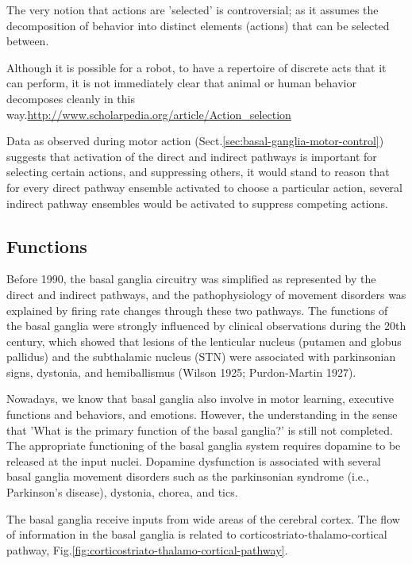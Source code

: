 \begin{mdframed}
The very notion that actions are 'selected' is controversial;
as it assumes the decomposition of behavior into distinct elements (actions)
that can be selected between. 

Although it is possible for a robot, to have a repertoire of discrete acts that
it can perform, it is not immediately clear that animal or human behavior
decomposes cleanly in this
way.\url{http://www.scholarpedia.org/article/Action_selection}

\end{mdframed}

Data as observed during motor action
(Sect.\ref{sec:basal-ganglia-motor-control}) suggests that activation of the
direct and indirect pathways is important for selecting certain actions, and
suppressing others, it would stand to reason that for every direct pathway
ensemble activated to choose a particular action, several indirect pathway
ensembles would be activated to suppress competing actions.




\subsection{Functions}

Before 1990, the basal ganglia circuitry was simplified as represented by the
direct and indirect pathways, and the pathophysiology of movement disorders was
explained by firing rate changes through these two pathways.
The functions of the basal ganglia were strongly influenced by
clinical observations during the 20th century, which showed that lesions of the
lenticular nucleus (putamen and globus pallidus) and the subthalamic nucleus
(STN) were associated with parkinsonian signs, dystonia, and hemiballismus
(Wilson 1925; Purdon-Martin 1927).

Nowadays, we know that basal ganglia also involve in motor learning, executive
functions and behaviors, and emotions.
However, the understanding in the sense that 'What is the primary function of
the basal ganglia?' is still not completed.
The appropriate functioning of the basal ganglia system requires dopamine to be
released at the input nuclei. Dopamine dysfunction is associated with several
basal ganglia movement disorders such as the parkinsonian syndrome (i.e.,
Parkinson's disease), dystonia, chorea, and tics.

The basal ganglia receive inputs from wide areas of the cerebral cortex.
The flow of information in the basal ganglia is related to
corticostriato-thalamo-cortical pathway,
Fig.\ref{fig:corticostriato-thalamo-cortical-pathway}.

